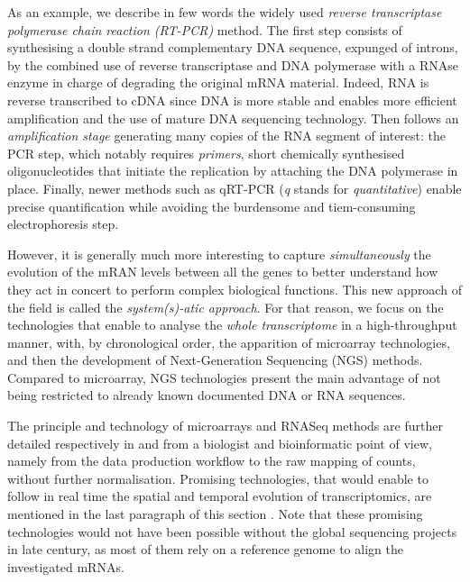 As an example, we describe in few words the widely used \textit{reverse transcriptase polymerase chain reaction (RT-PCR)} method. The first step consists of synthesising a double strand complementary DNA sequence, expunged of introns, by the combined use of reverse transcriptase and DNA polymerase with a RNAse enzyme in charge of degrading the original mRNA material. Indeed, RNA is reverse transcribed to cDNA since DNA is more stable and enables more efficient amplification and the use of mature DNA sequencing technology. Then follows an \textit{amplification stage} generating many copies of the RNA segment of interest: the PCR step, which notably requires \textit{primers}, short chemically synthesised oligonucleotides that initiate the replication by attaching the DNA polymerase in place. Finally, newer methods such as qRT-PCR (\textit{q} stands for \textit{quantitative}) enable precise quantification while avoiding the burdensome and tiem-consuming electrophoresis step.


However, it is generally much more interesting to capture \textit{simultaneously} the evolution of the mRAN levels between all the genes to better understand how they act in concert to perform complex biological functions. This new approach of the field is called the \textit{system(s)-atic approach}. For that reason, we focus on the technologies that enable to analyse the \textit{whole transcriptome} in a high-throughput manner, with, by chronological order, the apparition of microarray technologies, and then the development of Next-Generation Sequencing (NGS) methods. Compared to microarray, NGS technologies present the main advantage of not being restricted to already known documented DNA or RNA sequences. 

The principle and technology of microarrays and RNASeq methods are further detailed respectively in  and  from a biologist and \gls{bioinformatic} point of view, namely from the data production workflow to the raw mapping of counts, without further normalisation. Promising technologies, that would enable to follow in real time the spatial and temporal evolution of transcriptomics, are mentioned in the last paragraph of this section . Note that these promising technologies would not have been possible without the global sequencing projects in late  century, as most of them rely on a reference genome to align the investigated mRNAs. 


